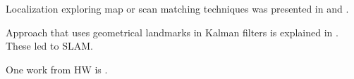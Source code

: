Localization exploring map or scan matching techniques was presented in \cite{Cox91} and \cite{Lu97}. 

Approach that uses geometrical landmarks in Kalman filters is explained in \cite{Leonard91}. These led to SLAM.

One work from HW is \cite{Ruiz01}.

